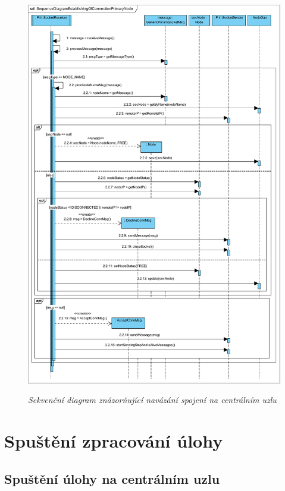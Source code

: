 \begin{figure}[H]
\begin{center}
    \scalebox{0.5}
    {
        \includegraphics{images/SequenceDiagramEstablishingOfConnectionPrimaryNode.pdf}
    }
    \caption{\label{obr:sequenceDiagramEstablishingOfConnectionPrimaryNode} {\it Sekvenční diagram znázorňující navázání spojení na centrálním uzlu}}
\end{center}
\end{figure}

\section{Spuštění zpracování úlohy}
\label{section:RunTask}

\subsection*{Spuštění úlohy na centrálním uzlu}
\label{subsection:RunTaskOnPrimaryNode}

